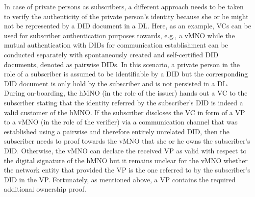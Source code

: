 \documentclass[conference]{IEEEtran}
\begin{document}
In case of private persons as subscribers, a different approach needs to be taken to verify the authenticity of the private person's identity because she or he might not be represented by a DID document in a DL. Here, as an example, VCs can be used for subscriber authentication purposes towards, e.g., a vMNO while the mutual authentication with DIDs for communication establishment can be conducted separately with spontaneously created and self-certified DID documents, denoted as pairwise DIDs. In this scenario, a private person in the role of a subscriber is assumed to be identifiable by a DID but the corresponding DID document is only hold by the subscriber and is not persisted in a DL. During on-boarding, the hMNO (in the role of the issuer) hands out a VC to the subscriber stating that the identity referred by the subscriber's DID is indeed a valid customer of the hMNO. If the subscriber discloses the VC in form of a VP to a vMNO (in the role of the verifier) via a communication channel that was established using a pairwise and therefore entirely unrelated DID, then the subscriber needs to proof towards the vMNO that she or he owns the subscriber's DID. Otherwise, the vMNO can declare the received VP as valid with respect to the digital signature of the hMNO but it remains unclear for the vMNO whether the network entity that provided the VP is the one referred to by the subscriber's DID in the VP. Fortunately, as mentioned above, a VP contains the required additional ownership proof. %



\end{document}
